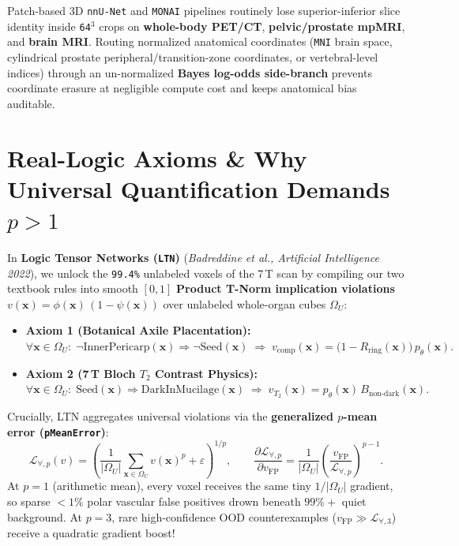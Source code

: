 \documentclass[10pt,a4paper]{article}
\begin{document}
\begin{clinbox}
Patch-based 3D \texttt{nnU-Net} and \texttt{MONAI} pipelines routinely lose superior-inferior slice identity inside \texttt{64$^3$} crops on \textbf{whole-body PET/CT}, \textbf{pelvic/prostate mpMRI}, and \textbf{brain MRI}. Routing normalized anatomical coordinates (\texttt{MNI} brain space, cylindrical prostate peripheral/transition-zone coordinates, or vertebral-level indices) through an un-normalized \textbf{Bayes log-odds side-branch} prevents coordinate erasure at negligible compute cost and keeps anatomical bias auditable.
\end{clinbox}

\section{Real-Logic Axioms \& Why Universal Quantification Demands $p > 1$}

In \textbf{Logic Tensor Networks (\texttt{LTN})} (\textit{Badreddine et al., Artificial Intelligence 2022}), we unlock the \texttt{99.4\%} unlabeled voxels of the 7\,T scan by compiling our two textbook rules into smooth $[0, 1]$ \textbf{Product T-Norm implication violations} $v(\mathbf{x}) = \phi(\mathbf{x})\,(1 - \psi(\mathbf{x}))$ over unlabeled whole-organ cubes $\Omega_U$:
\begin{itemize}
    \item \textbf{Axiom 1 (Botanical Axile Placentation):}
    $\forall \mathbf{x} \in \Omega_U:\; \neg\text{InnerPericarp}(\mathbf{x}) \Rightarrow \neg\text{Seed}(\mathbf{x}) \;\Longrightarrow\; v_{\text{comp}}(\mathbf{x}) = \big(1 - R_{\text{ring}}(\mathbf{x})\big)\,p_\theta(\mathbf{x}).$
    \item \textbf{Axiom 2 (7\,T Bloch $T_2$ Contrast Physics):}
    $\forall \mathbf{x} \in \Omega_U:\; \text{Seed}(\mathbf{x}) \Rightarrow \text{DarkInMucilage}(\mathbf{x}) \;\Longrightarrow\; v_{T_2}(\mathbf{x}) = p_\theta(\mathbf{x})\,B_{\text{non-dark}}(\mathbf{x}).$
\end{itemize}
Crucially, LTN aggregates universal violations via the \textbf{generalized $p$-mean error (\texttt{pMeanError})}:
\[
    \mathcal{L}_{\forall, p}(v) = \left(\frac{1}{|\Omega_U|} \sum_{\mathbf{x} \in \Omega_U} v(\mathbf{x})^p + \varepsilon\right)^{1/p},
    \qquad
    \frac{\partial \mathcal{L}_{\forall, p}}{\partial v_{\text{FP}}} = \frac{1}{|\Omega_U|} \left(\frac{v_{\text{FP}}}{\mathcal{L}_{\forall, p}}\right)^{p - 1}.
\]
At $p = 1$ (arithmetic mean), every voxel receives the same tiny $1/|\Omega_U|$ gradient, so sparse $<1\%$ polar vascular false positives drown beneath $99\%+$ quiet background. At \textbf{$p = 3$}, rare high-confidence OOD counterexamples ($v_{\text{FP}} \gg \mathcal{L}_{\forall,3}$) receive a quadratic gradient boost!
\end{document}
